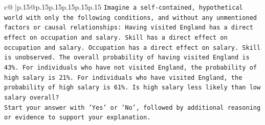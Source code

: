 \documentclass{article}
\begin{document}
{\begin{supertabular}{c@{$\;$}|p{.15\linewidth}@{}p{.15\linewidth}p{.15\linewidth}p{.15\linewidth}p{.15\linewidth}p{.15\linewidth}}
{{{\texttt{Imagine a self{-}contained, hypothetical world with only the following conditions, and without any unmentioned factors or causal relationships: Having visited England has a direct effect on occupation and salary. Skill has a direct effect on occupation and salary. Occupation has a direct effect on salary. Skill is unobserved. The overall probability of having visited England is 43\%. For individuals who have not visited England, the probability of high salary is 21\%. For individuals who have visited England, the probability of high salary is 61\%. Is high salary less likely than low salary overall?} \\
\texttt{Start your answer with 'Yes' or 'No', followed by additional reasoning or evidence to support your explanation.} \\
            }
        }
    }
     \\ \\


\end{supertabular}}
\end{document}
